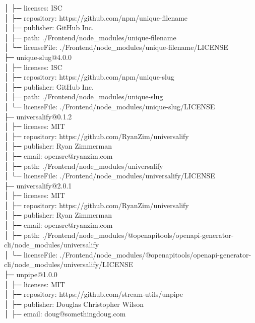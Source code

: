 \documentclass[
    paper=a4,
    twoside=false,
    parskip=half,
    listof=entryprefix,
    listof=totoc,
    index=totoc,
    bibliography=totoc,
    headsepline,
]{scrbook}
\begin{document}
    │  ├─ licenses: ISC\\
    │  ├─ repository: https://github.com/npm/unique-filename\\
    │  ├─ publisher: GitHub Inc.\\
    │  ├─ path: ./Frontend/node\_modules/unique-filename\\
    │  └─ licenseFile: ./Frontend/node\_modules/unique-filename/LICENSE\\
    ├─ unique-slug@4.0.0\\
    │  ├─ licenses: ISC\\
    │  ├─ repository: https://github.com/npm/unique-slug\\
    │  ├─ publisher: GitHub Inc.\\
    │  ├─ path: ./Frontend/node\_modules/unique-slug\\
    │  └─ licenseFile: ./Frontend/node\_modules/unique-slug/LICENSE\\
    ├─ universalify@0.1.2\\
    │  ├─ licenses: MIT\\
    │  ├─ repository: https://github.com/RyanZim/universalify\\
    │  ├─ publisher: Ryan Zimmerman\\
    │  ├─ email: opensrc@ryanzim.com\\
    │  ├─ path: ./Frontend/node\_modules/universalify\\
    │  └─ licenseFile: ./Frontend/node\_modules/universalify/LICENSE\\
    ├─ universalify@2.0.1\\
    │  ├─ licenses: MIT\\
    │  ├─ repository: https://github.com/RyanZim/universalify\\
    │  ├─ publisher: Ryan Zimmerman\\
    │  ├─ email: opensrc@ryanzim.com\\
    │  ├─ path: ./Frontend/node\_modules/@openapitools/openapi-generator-cli/node\_modules/universalify\\
    │  └─ licenseFile: ./Frontend/node\_modules/@openapitools/openapi-generator-cli/node\_modules/universalify/LICENSE\\
    ├─ unpipe@1.0.0\\
    │  ├─ licenses: MIT\\
    │  ├─ repository: https://github.com/stream-utils/unpipe\\
    │  ├─ publisher: Douglas Christopher Wilson\\
    │  ├─ email: doug@somethingdoug.com\\
\end{document}
